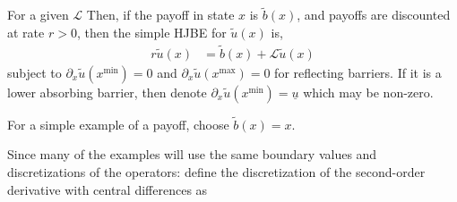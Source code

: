 \documentclass[11pt]{article}
\newcommand{\D}[1][]{\ensuremath{\partial_{#1}}}
\begin{document}
For a given $\mathcal{L}$ Then, if the payoff in state $x$ is $\tilde{b}(x)$, and payoffs are discounted at rate $r > 0$, then the simple HJBE for $\tilde{u}(x)$ is,
\begin{align}
r \tilde{u}(x) &= \tilde{b}(x) + \mathcal{L} \tilde{u}(x)\label{eq:general-stationary-HJBE}
\end{align}
subject to $\D[x]\tilde{u}(x^{\min}) = 0$ and $\D[x]\tilde{u}(x^{\max}) = 0$ for reflecting barriers.  If it is a lower absorbing barrier, then denote $\D[x]\tilde{u}(x^{\min}) = \underline{u}$ which may be non-zero.

For a simple example of a payoff, choose $\tilde{b}(x) = x$.

Since many of the examples will use the same boundary values and discretizations of the operators: define the discretization of the second-order derivative with central differences as
\end{document}
